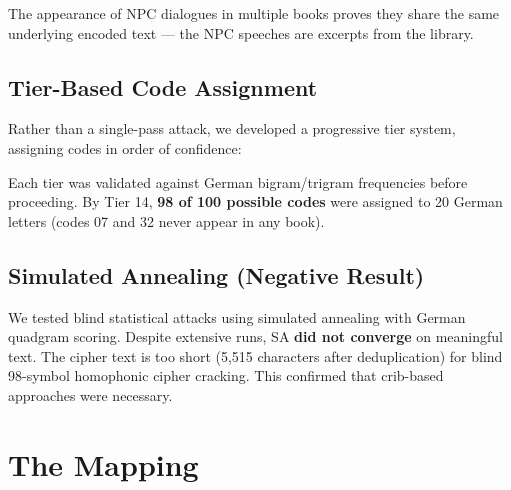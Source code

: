 \documentclass[11pt,a4paper]{article}
\begin{document}
The appearance of NPC dialogues in multiple books proves they share the same underlying encoded text --- the NPC speeches are excerpts from the library.

\subsection{Tier-Based Code Assignment}

Rather than a single-pass attack, we developed a progressive tier system, assigning codes in order of confidence:

\begin{table}[h]
\centering
{}
\end{table}

Each tier was validated against German bigram/trigram frequencies before proceeding. By Tier 14, \textbf{98 of 100 possible codes} were assigned to 20 German letters (codes 07 and 32 never appear in any book).

\subsection{Simulated Annealing (Negative Result)}

We tested blind statistical attacks using simulated annealing with German quadgram scoring. Despite extensive runs, SA \textbf{did not converge} on meaningful text. The cipher text is too short (5,515 characters after deduplication) for blind 98-symbol homophonic cipher cracking. This confirmed that crib-based approaches were necessary.

\section{The Mapping}
\end{document}
